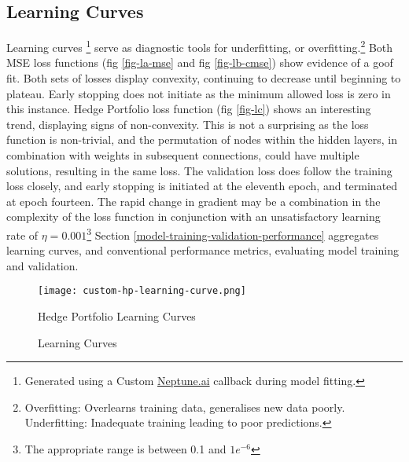 \documentclass[12pt]{article}
\begin{document}
\subsection{Learning Curves}
Learning curves 
\footnote{Generated using a Custom \href{https://neptune.ai/}{Neptune.ai} callback during model fitting.}
serve as diagnostic tools for underfitting, or overfitting.\footnote{Overfitting: Overlearns training data, generalises new data poorly. Underfitting: Inadequate training leading to poor predictions.}
Both MSE loss functions (fig \ref{fig-la-mse} and fig \ref{fig-lb-cmse}) show evidence of a goof fit. 
Both sets of losses display convexity, continuing to decrease until beginning to plateau. 
Early stopping does not initiate as the minimum allowed loss is zero in this instance.
Hedge Portfolio loss function (fig \ref{fig-lc}) shows an interesting trend, displaying signs of non-convexity.
This is not a surprising as the loss function is non-trivial, and the permutation of nodes within the hidden layers,
in combination with weights in subsequent connections, could have multiple solutions, resulting in the same loss.
The validation loss does follow the training loss closely, and early stopping is initiated at the eleventh epoch, and terminated at epoch fourteen.
The rapid change in gradient may be a combination in the complexity of the loss function in conjunction with an unsatisfactory learning rate of $\eta = 0.001$\footnote{The appropriate range is between 0.1 and $1e^{-6}$}
Section \ref{model-training-validation-performance} aggregates learning curves, and conventional performance metrics, evaluating model training and validation.

\begin{figure}[H]
	\centering
    \texttt{[image: custom-hp-learning-curve.png]}
	\caption{Hedge Portfolio Learning Curves}
	\label{fig:hp-lc}
  \end{figure}
\begin{figure}[H]
	\centering
    \vfill
    \caption{Learning Curves}
    \label{fig:mse-learning-curves}
  \end{figure}
 
\end{document}
